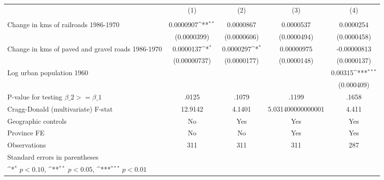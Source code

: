 {
\def\sym#1{\ifmmode^{#1}\else\(^{#1}\)\fi}
\begin{tabular}{l*{4}{c}}
\hline\hline
                &\multicolumn{1}{c}{(1)}&\multicolumn{1}{c}{(2)}&\multicolumn{1}{c}{(3)}&\multicolumn{1}{c}{(4)}\\
                &\multicolumn{1}{c}{}&\multicolumn{1}{c}{}&\multicolumn{1}{c}{}&\multicolumn{1}{c}{}\\
\hline
Change in kms of railroads 1986-1970&0.0000907\sym{**} &0.0000867         &0.0000537         &0.0000254         \\
                &(0.0000399)         &(0.0000606)         &(0.0000494)         &(0.0000458)         \\
[1em]
Change in kms of paved and gravel roads 1986-1970&0.0000137\sym{*}  &0.0000297\sym{*}  &0.00000975         &-0.00000813         \\
                &(0.00000737)         &(0.0000177)         &(0.0000148)         &(0.0000137)         \\
[1em]
Log urban population 1960&                  &                  &                  &  0.00315\sym{***}\\
                &                  &                  &                  &(0.000409)         \\
\hline
P-value for testing $\beta\_{2} >= \beta\_{1}$&    .0125         &    .1079         &    .1199         &    .1658         \\
Cragg-Donald (multivariate) F-stat&  12.9142         &   4.1401         &5.031400000000001         &    4.411         \\
Geographic controls&       No         &      Yes         &      Yes         &      Yes         \\
Province FE     &       No         &       No         &      Yes         &      Yes         \\
Observations    &      311         &      311         &      311         &      287         \\
\hline\hline
\multicolumn{5}{l}{\footnotesize Standard errors in parentheses}\\
\multicolumn{5}{l}{\footnotesize \sym{*} \(p<0.10\), \sym{**} \(p<0.05\), \sym{***} \(p<0.01\)}\\
\end{tabular}
}
